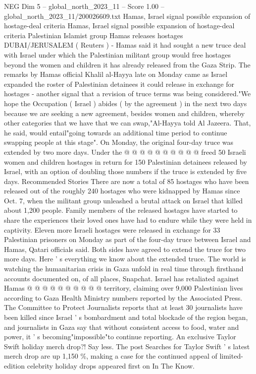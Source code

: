 \begin{textsample}{NEG Dim 5 – global\_north\_2023\_11 – Score 1.00 – global\_north\_2023\_11/200026609.txt}  \label{ex:f5_neg_040}
Hamas, Israel signal possible expansion of hostage-deal criteria Hamas, Israel signal possible expansion of hostage-deal criteria Palestinian Islamist group Hamas releases hostages DUBAI/JERUSALEM ( Reuters ) - Hamas said it had sought a new truce deal with Israel under which the Palestinian militant group would free hostages beyond the women and children it has already released from the Gaza Strip.
The remarks by Hamas official Khalil al-Hayya late on Monday came as Israel expanded the roster of Palestinian detainees it could release in exchange for hostages - another signal that a revision of truce terms was being considered."We hope the Occupation ( Israel ) abides ( by the agreement ) in the next two days because we are seeking a new agreement, besides women and children, whereby other categories that we have that we can swap,"Al-Hayya told Al Jazeera.
That, he said, would entail"going towards an additional time period to continue swapping people at this stage".
On Monday, the original four-day truce was extended by two more days.
Under the @ @ @ @ @ @ @ @ @ @ freed 50 Israeli women and children hostages in return for 150 Palestinian detainees released by Israel, with an option of doubling those numbers if the truce is extended by five days.
Recommended Stories There are now a total of 85 hostages who have been released out of the roughly 240 hostages who were kidnapped by Hamas since Oct. 7, when the militant group unleashed a brutal attack on Israel that killed about 1,200 people.
Family members of the released hostages have started to share the experiences their loved ones have had to endure while they were held in captivity.
Eleven more Israeli hostages were released in exchange for 33 Palestinian prisoners on Monday as part of the four-day truce between Israel and Hamas, Qatari officials said.
Both sides have agreed to extend the truce for two more days.
Here ' s everything we know about the extended truce.
The world is watching the humanitarian crisis in Gaza unfold in real time through firsthand accounts documented on, of all places, Snapchat.
Israel has retaliated against Hamas @ @ @ @ @ @ @ @ @ @ territory, claiming over 9,000 Palestinian lives according to Gaza Health Ministry numbers reported by the Associated Press.
The Committee to Protect Journalists reports that at least 30 journalists have been killed since Israel ' s bombardment and total blockade of the region began, and journalists in Gaza say that without consistent access to food, water and power, it ' s becoming"impossible"to continue reporting.
An exclusive Taylor Swift holiday merch drop?!
Say less.
The post Searches for Taylor Swift ' s latest merch drop are up 1,150 \%, making a case for the continued appeal of limited-edition celebrity holiday drops appeared first on In The Know.

\end{textsample}
